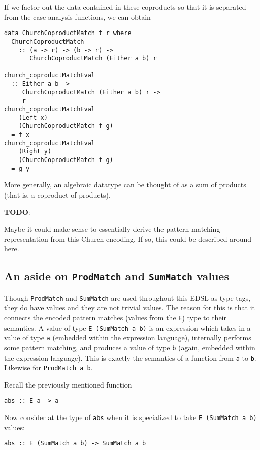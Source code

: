 \documentclass[sigplan,anonymous,review]{acmart}
\newcommand{\ttt}{\texttt}
\newenvironment{todo}
  {\begin{tcolorbox}
   \textbf{TODO}:
  }
  {\end{tcolorbox}
  }
\begin{document}
If we factor out the data contained in these coproducts so that it is separated from the
case analysis functions, we can obtain

\begin{lstlisting}
data ChurchCoproductMatch t r where
  ChurchCoproductMatch
    :: (a -> r) -> (b -> r) ->
       ChurchCoproductMatch (Either a b) r

church_coproductMatchEval
  :: Either a b ->
     ChurchCoproductMatch (Either a b) r ->
     r
church_coproductMatchEval
    (Left x)
    (ChurchCoproductMatch f g)
  = f x
church_coproductMatchEval
    (Right y)
    (ChurchCoproductMatch f g)
  = g y
\end{lstlisting}



More generally, an algebraic datatype can be thought of as a sum of products
(that is, a coproduct of products).

\begin{todo}
  Maybe it could make sense to essentially derive the pattern matching representation
  from this Church encoding. If so, this could be described around here.
\end{todo}

\subsection{An aside on \ttt{ProdMatch} and \ttt{SumMatch} values}

Though \ttt{ProdMatch} and \ttt{SumMatch} are used throughout this EDSL as type
tags, they do have values and they are not trivial values. The reason for this
is that it connects the encoded pattern matches (values from the \ttt{E}) type
to their semantics. A value of type \ttt{E (SumMatch a b)} is an expression
which takes in a value of type \ttt{a} (embedded within the expression
language), internally performs some pattern matching, and produces a value of
type \ttt{b} (again, embedded within the expression language). This is exactly
the semantics of a function from \ttt{a} to \ttt{b}. Likewise for \ttt{ProdMatch a b}.

Recall the previously mentioned function

\begin{lstlisting}
abs :: E a -> a
\end{lstlisting}

Now consider at the type of \ttt{abs} when it is specialized to take
\ttt{E (SumMatch a b)} values:

\begin{lstlisting}
abs :: E (SumMatch a b) -> SumMatch a b
\end{lstlisting}
\end{document}
